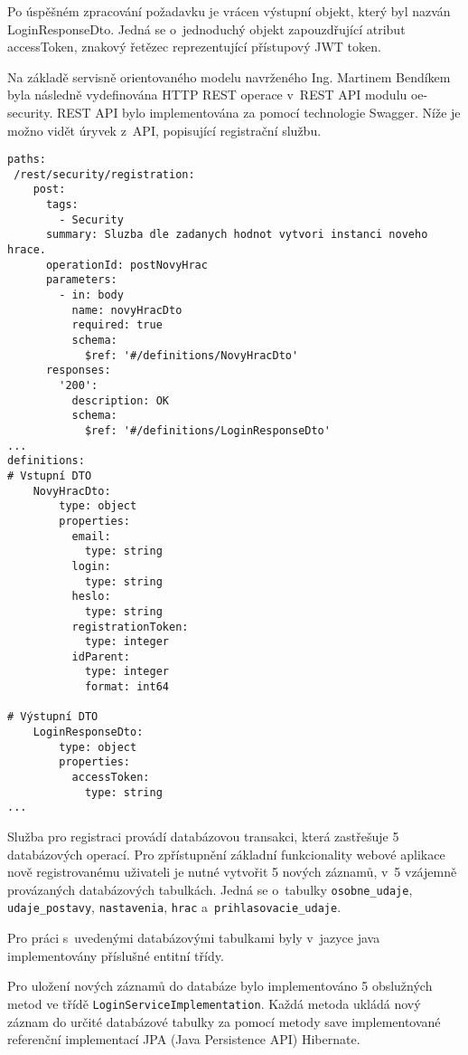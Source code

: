 \documentclass[12pt]{article}
\begin{document}
Po úspěšném zpracování požadavku je vrácen výstupní objekt, 
který byl nazván LoginResponseDto.
Jedná se o~jednoduchý objekt zapouzdřující atribut accessToken, znakový řetězec reprezentující přístupový JWT token. 

Na základě servisně orientovaného modelu navrženého Ing. Martinem Bendíkem byla
následně vydefinována HTTP REST operace v~REST API modulu oe-security. 
REST API bylo implementována za pomocí technologie Swagger. Níže je možno vidět úryvek z~API, popisující registrační službu. 

\clearpage

\begin{lstlisting}
paths:
 /rest/security/registration:
    post:
      tags:
        - Security
      summary: Sluzba dle zadanych hodnot vytvori instanci noveho hrace.
      operationId: postNovyHrac
      parameters:
        - in: body
          name: novyHracDto
          required: true
          schema:
            $ref: '#/definitions/NovyHracDto'
      responses:
        '200':
          description: OK
          schema:
            $ref: '#/definitions/LoginResponseDto'
...
definitions:
# Vstupní DTO
    NovyHracDto:
        type: object
        properties:
          email:
            type: string
          login:
            type: string
          heslo:
            type: string
          registrationToken:
            type: integer
          idParent:
            type: integer
            format: int64
        
# Výstupní DTO 
    LoginResponseDto:
        type: object
        properties:
          accessToken:
            type: string
...
\end{lstlisting}

Služba pro registraci provádí databázovou transakci,
která zastřešuje 5 databázových operací. 
Pro zpřístupnění základní funkcionality webové aplikace nově registrovanému uživateli je nutné vytvořit 5 nových záznamů,
v~5 vzájemně provázaných databázových tabulkách.
Jedná se o~tabulky \texttt{osobne\_udaje}, \texttt{udaje\_postavy}, \texttt{nastavenia}, \texttt{hrac} a~\texttt{prihlasovacie\_udaje}.

Pro práci s~uvedenými databázovými tabulkami byly v~jazyce java implementovány příslušné entitní třídy.

\obrazek
{}

\clearpage

Pro uložení nových záznamů do databáze bylo implementováno 5 obslužných metod ve třídě \texttt{LoginServiceImplementation}. Každá metoda ukládá nový záznam do určité databázové tabulky za pomocí metody save implementované referenční implementací JPA (Java Persistence API) Hibernate. 
\end{document}
